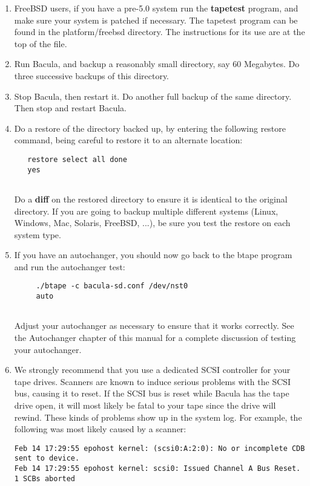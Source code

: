 \begin{enumerate}
\item FreeBSD users, if you have a pre-5.0 system run the {\bf tapetest}
   program, and make sure your system is patched if necessary. The tapetest
   program can be found in the platform/freebsd directory. The instructions
   for its use are at the top of the file.

\item Run Bacula, and backup a reasonably small directory, say 60
   Megabytes.  Do three successive backups of this directory.

\item Stop Bacula, then restart it.  Do another full backup of the same
   directory.  Then stop and restart Bacula.

\item Do a restore of the directory backed up, by entering the  following
   restore command, being careful to restore it to  an alternate location:  


\footnotesize
\begin{verbatim}
   restore select all done
   yes
   
\end{verbatim}
\normalsize

   Do a {\bf diff} on the restored directory to ensure it is identical  to the
   original directory. If you are going to backup multiple different systems
   (Linux, Windows, Mac, Solaris, FreeBSD, ...), be sure you test the restore
   on each system type.

\item If you have an autochanger, you should now go back to the  btape program
   and run the autochanger test:  

\footnotesize
\begin{verbatim}
     ./btape -c bacula-sd.conf /dev/nst0
     auto
     
\end{verbatim}
\normalsize

   Adjust your autochanger as necessary to ensure that it works  correctly. See
   the Autochanger chapter of this manual  for a complete discussion of testing
   your autochanger.  

\item We strongly recommend that you use a dedicated SCSI
   controller for your tape drives. Scanners are known to induce
   serious problems with the SCSI bus, causing it to reset. If the
   SCSI bus is reset while Bacula has the tape drive open, it will
   most likely be fatal to your tape since the drive will rewind.
   These kinds of problems show up in the system log. For example,
   the following was most likely caused by a scanner:

\footnotesize
\begin{verbatim}
Feb 14 17:29:55 epohost kernel: (scsi0:A:2:0): No or incomplete CDB sent to device.
Feb 14 17:29:55 epohost kernel: scsi0: Issued Channel A Bus Reset. 1 SCBs aborted
\end{verbatim}
\normalsize

\end{enumerate}

